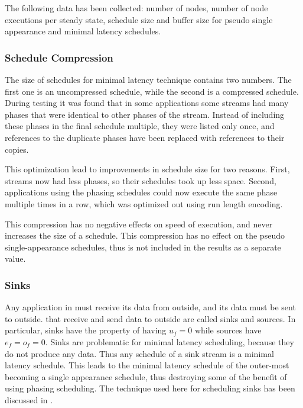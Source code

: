 The following data has been collected: number of nodes, number of
node executions per steady state, schedule size and buffer size
for pseudo single appearance and minimal latency schedules.

\subsubsection{Schedule Compression}

The size of schedules for minimal latency technique contains two
numbers. The first one is an uncompressed schedule, while the
second is a compressed schedule. During testing it was found that
in some applications some streams had many phases that were
identical to other phases of the stream. Instead of including
these phases in the final schedule multiple, they were listed only
once, and references to the duplicate phases have been replaced
with references to their copies.

This optimization lead to improvements in schedule size for two
reasons. First, streams now had less phases, so their schedules
took up less space. Second, applications using the phasing
schedules could now execute the same phase multiple times in a
row, which was optimized out using run length encoding.

This compression has no negative effects on speed of execution,
and never increases the size of a schedule. This compression has
no effect on the pseudo single-appearance schedules, thus is not
included in the results as a separate value.

\subsubsection{Sinks}

Any application in {\StreamIt} must receive its data from outside,
and its data must be sent to outside. {\filters} that receive and
send data to outside are called sinks and sources. In particular,
sinks have the property of having $u_f = 0$ while sources have
$e_f = o_f = 0$. Sinks are problematic for minimal latency
scheduling, because they do not produce any data. Thus any
schedule of a sink stream is a minimal latency schedule. This
leads to the minimal latency schedule of the outer-most
{\pipeline} becoming a single appearance schedule, thus destroying
some of the benefit of using phasing scheduling. The technique
used here for scheduling {\pipeline} sinks has been discussed in
\cite{karczma-thesis}.

